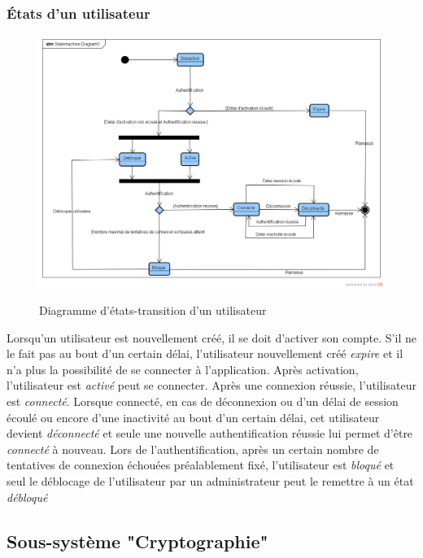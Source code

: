 \subsubsection{États d'un utilisateur}
\begin{figure}[H]
	\centering
	\begin{minipage}{12cm}
		\centering
		{\includegraphics[height=0.35\textheight, width=1\textwidth]{fig/Users-statemachine-diiagram.png}}
	\end{minipage}
	\caption{Diagramme d'états-transition d'un utilisateur}
	\label{fig:7.13}
\end{figure}
Lorsqu'un utilisateur est nouvellement créé, il se doit d'activer son compte. S'il ne le fait pas au bout d'un certain délai, l'utilisateur nouvellement créé \textit{expire} et il n'a plus la possibilité de se connecter à l'application. Après activation, l'utilisateur est \textit{activé} peut se connecter. Après une connexion réussie, l'utilisateur est \textit{connecté}. Lorsque connecté, en cas de déconnexion ou d'un délai de session écoulé ou encore d'une inactivité au bout d'un certain délai, cet utilisateur devient \textit{déconnecté} et seule une nouvelle authentification réussie lui permet d'être \textit{connecté} à nouveau. Lors de l'authentification, après un certain nombre de tentatives de connexion échouées préalablement fixé, l'utilisateur est \textit{bloqué} et seul le déblocage de l'utilisateur par un administrateur peut le remettre à un état \textit{débloqué}

\subsection{Sous-système "Cryptographie"}
